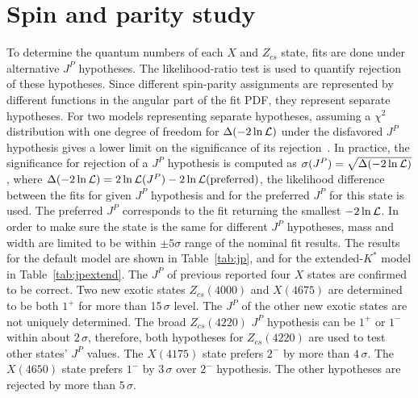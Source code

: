 \section{Spin and parity study}
\label{Sec:JP}

To determine the quantum numbers of each $X$ and $Z_{cs}$ state, 
fits are done under alternative $J^P$ hypotheses. 
The likelihood-ratio test is used to quantify rejection of these hypotheses. 
Since different spin-parity assignments are represented by different functions in the angular part of the fit PDF, 
they represent separate hypotheses. For two models representing separate
hypotheses, 
assuming a $\chi^2$ distribution with one degree of freedom for $\Delta(-2\ln\mathcal{L})$ under the disfavored $J^P$ hypothesis gives a lower limit on the significance of its rejection~\supercite{LHCb-PAPER-2014-014}. 
In practice, the significance for rejection of a $J^P$ hypothesis is computed as  $\sigma(J^P)=\sqrt{\Delta(-2\ln\mathcal{L})}$, 
where $\Delta(-2\ln\mathcal{L})=2\ln\mathcal{L}(J^P)-2\ln\mathcal{L}(\rm preferred)$, 
\ie the likelihood difference between the fits for given $J^P$ hypothesis and for the preferred $J^P$ for this state is used. 
The preferred $J^P$ corresponds to the fit returning the smallest $-2\ln\mathcal{L}$. 
In order to make sure the state is the same for different $J^P$ hypotheses, mass and width are limited to be within $\pm5\sigma$ range of the nominal fit results. 
The results for the default model are shown in Table~\ref{tab:jp}, 
and for the extended-$K^*$ model in Table~\ref{tab:jpextend}. 
The $J^P$ of previous reported four $X$ states are confirmed to be correct. 
Two new exotic states $Z_{cs}(4000)$ and $X(4675)$ are determined to be both $1^+$ for more than 15\,$\sigma$ level. 
The $J^P$ of the other new exotic states are not uniquely determined. 
The broad $Z_{cs}(4220)$ $J^P$ hypothesis can be $1^+$ or $1^-$ within about $2\,\sigma$, 
therefore, both hypotheses for $Z_{cs}(4220)$ are used to test other states' $J^P$ values. 
The $X(4175)$ state prefers $2^-$ by more than $4\,\sigma$. 
The $X(4650)$ state prefers $1^-$ by $3\,\sigma$ over $2^-$ hypothesis. 
The other hypotheses are rejected by more than $5\,\sigma$.
